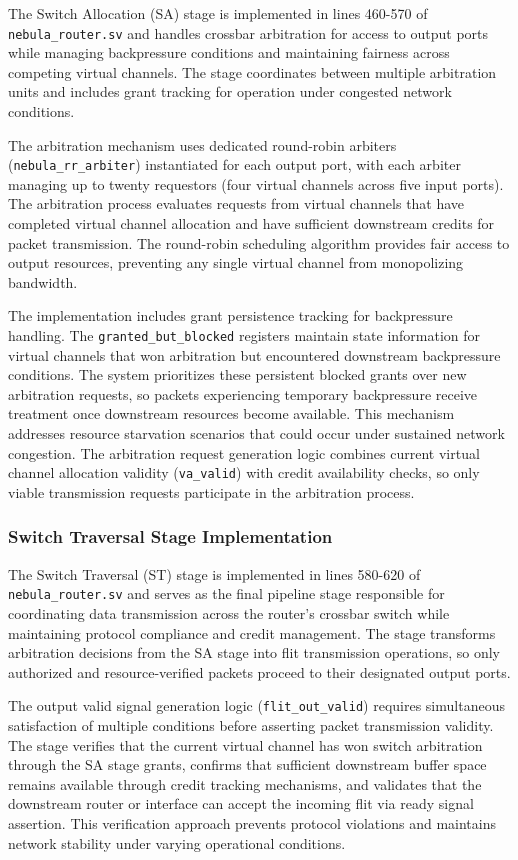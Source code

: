 \documentclass[12pt,letterpaper]{article}
\begin{document}
The Switch Allocation (SA) stage is implemented in lines 460-570 of \texttt{nebula\_router.sv} and handles crossbar arbitration for access to output ports while managing backpressure conditions and maintaining fairness across competing virtual channels. The stage coordinates between multiple arbitration units and includes grant tracking for operation under congested network conditions.

The arbitration mechanism uses dedicated round-robin arbiters (\texttt{nebula\_rr\_arbiter}) instantiated for each output port, with each arbiter managing up to twenty requestors (four virtual channels across five input ports). The arbitration process evaluates requests from virtual channels that have completed virtual channel allocation and have sufficient downstream credits for packet transmission. The round-robin scheduling algorithm provides fair access to output resources, preventing any single virtual channel from monopolizing bandwidth.

The implementation includes grant persistence tracking for backpressure handling. The \texttt{granted\_but\_blocked} registers maintain state information for virtual channels that won arbitration but encountered downstream backpressure conditions. The system prioritizes these persistent blocked grants over new arbitration requests, so packets experiencing temporary backpressure receive treatment once downstream resources become available. This mechanism addresses resource starvation scenarios that could occur under sustained network congestion. The arbitration request generation logic combines current virtual channel allocation validity (\texttt{va\_valid}) with credit availability checks, so only viable transmission requests participate in the arbitration process.

\subsubsection{Switch Traversal Stage Implementation}

The Switch Traversal (ST) stage is implemented in lines 580-620 of \texttt{nebula\_router.sv} and serves as the final pipeline stage responsible for coordinating data transmission across the router's crossbar switch while maintaining protocol compliance and credit management. The stage transforms arbitration decisions from the SA stage into flit transmission operations, so only authorized and resource-verified packets proceed to their designated output ports.

The output valid signal generation logic (\texttt{flit\_out\_valid}) requires simultaneous satisfaction of multiple conditions before asserting packet transmission validity. The stage verifies that the current virtual channel has won switch arbitration through the SA stage grants, confirms that sufficient downstream buffer space remains available through credit tracking mechanisms, and validates that the downstream router or interface can accept the incoming flit via ready signal assertion. This verification approach prevents protocol violations and maintains network stability under varying operational conditions.
\end{document}
